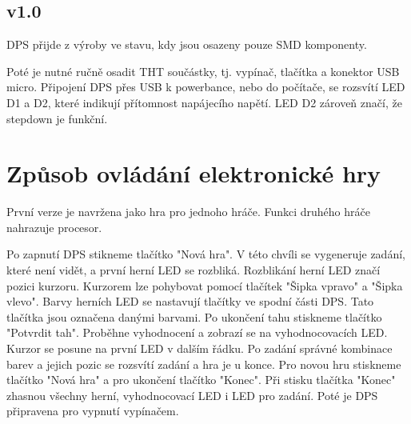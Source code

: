 \section{v1.0}
DPS přijde z výroby ve stavu, kdy jsou osazeny pouze SMD komponenty. %

Poté je nutné ručně osadit THT součástky, tj. vypínač, tlačítka a konektor USB micro. Připojení DPS přes USB k powerbance, 
nebo do počítače, se rozsvítí LED D1 a D2, které indikují přítomnost napájecího napětí. LED D2 zároveň značí, že stepdown je 
funkční.

\chapter{Způsob ovládání elektronické hry}
První verze je navržena jako hra pro jednoho hráče. Funkci druhého hráče nahrazuje procesor.

Po zapnutí DPS stikneme tlačítko "Nová hra". V této chvíli se vygeneruje zadání, které není vidět, a první herní LED se 
rozbliká. Rozblikání herní LED značí pozici kurzoru. 
Kurzorem lze pohybovat pomocí tlačítek "Šipka vpravo" a "Šipka vlevo". Barvy herních LED se nastavují tlačítky ve spodní části 
DPS. Tato tlačítka jsou označena danými barvami.
Po ukončení tahu stiskneme tlačítko "Potvrdit tah". Proběhne vyhodnocení a zobrazí se na vyhodnocovacích LED. Kurzor se posune
na první LED v dalším řádku.
Po zadání správné kombinace barev a jejich pozic se rozsvítí zadání a hra je u konce. Pro novou hru stiskneme tlačítko
"Nová hra" a pro ukončení tlačítko "Konec".
Při stisku tlačítka "Konec" zhasnou všechny herní, vyhodnocovací LED i LED pro zadání. Poté je DPS připravena pro vypnutí
vypínačem.



















